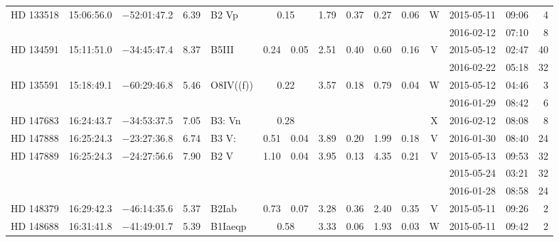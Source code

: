 \begin{tiny}
\begin{longtable}{lrrrll@{$\,\pm$\,}rl@{$\,\pm$\,}rl@{$\,\pm$\,}rcrrr}
HD 133518     &15:06:56.0&  $-$52:01:47.2&        6.39&  B2 Vp &\multicolumn{2}{c}{0.15}&    1.79 & 0.37 &      0.27 & 0.06 &    W  &2015-05-11 &09:06&    4\\  %
              &          &               &            &                 & \multicolumn{6}{c}{}                              &       &2016-02-12 &07:10&    8\\  %
HD 134591     &15:11:51.0&  $-$34:45:47.4&        8.37&  B5III          & 0.24 & 0.05   &    2.51 & 0.40 &      0.60 & 0.16 &    V  &2015-05-12 &02:47&   40\\  %
              &          &               &            &                 & \multicolumn{6}{c}{}                              &       &2016-02-22 &05:18&   32\\  %
HD 135591     &15:18:49.1&  $-$60:29:46.8&        5.46&  O8IV((f))&\multicolumn{2}{c}{0.22}& 3.57 & 0.18 &      0.79 & 0.04 &    W  &2015-05-12 &04:46&    3\\  %
              &          &               &            &                 & \multicolumn{6}{c}{}                              &       &2016-01-29 &08:42&    6\\  %
HD 147683     &16:24:43.7&  $-$34:53:37.5&        7.05&  B3: Vn&\multicolumn{2}{c}{0.28}&\multicolumn{2}{c}{}&\multicolumn{2}{c}{}&X&2016-02-12 &08:08&    8\\  %
HD 147888     &16:25:24.3&  $-$23:27:36.8&        6.74&  B3 V:          & 0.51 & 0.04   &    3.89 & 0.20 &      1.99 & 0.18 &    V  &2016-01-30 &08:40&   24\\  %
HD 147889     &16:25:24.3&  $-$24:27:56.6&        7.90&  B2 V           & 1.10 & 0.04   &    3.95 & 0.13 &      4.35 & 0.21 &    V  &2015-05-13 &09:53&   32\\  %
              &          &               &            &                 & \multicolumn{6}{c}{}                              &       &2015-05-24 &03:21&   32\\  %
              &          &               &            &                 & \multicolumn{6}{c}{}                              &       &2016-01-28 &08:58&   24\\  %
HD 148379     &16:29:42.3&  $-$46:14:35.6&       5.37&   B2Iab          & 0.73 & 0.07   &    3.28 & 0.36 &      2.40 & 0.35 &    V  &2015-05-11 &09:26&    2\\  %
HD 148688     &16:31:41.8&  $-$41:49:01.7&       5.39&   B1Iaeqp&\multicolumn{2}{c}{0.58}&   3.33 & 0.06 &      1.93 & 0.03 &    W  &2015-05-11 &09:42&    2\\  %

\end{longtable}
\end{tiny}
